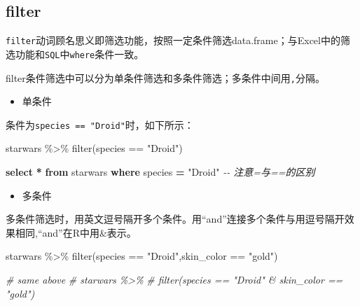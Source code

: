 \documentclass[
]{book}
\newenvironment{Shaded}{\begin{snugshade}}{\end{snugshade}}
\newcommand{\CommentTok}[1]{\textcolor[rgb]{0.56,0.35,0.01}{\textit{#1}}}
\newcommand{\FunctionTok}[1]{\textcolor[rgb]{0.00,0.00,0.00}{#1}}
\newcommand{\KeywordTok}[1]{\textcolor[rgb]{0.13,0.29,0.53}{\textbf{#1}}}
\newcommand{\NormalTok}[1]{#1}
\newcommand{\OperatorTok}[1]{\textcolor[rgb]{0.81,0.36,0.00}{\textbf{#1}}}
\newcommand{\OtherTok}[1]{\textcolor[rgb]{0.56,0.35,0.01}{#1}}
\newcommand{\SpecialCharTok}[1]{\textcolor[rgb]{0.00,0.00,0.00}{#1}}
\newcommand{\StringTok}[1]{\textcolor[rgb]{0.31,0.60,0.02}{#1}}
\providecommand{\tightlist}{%
  \setlength{\itemsep}{0pt}\setlength{\parskip}{0pt}}
\begin{document}
\hypertarget{dplyr-filter}{%
\subsection{filter}\label{dplyr-filter}}

\texttt{filter}动词顾名思义即筛选功能，按照一定条件筛选data.frame；与Excel中的筛选功能和\texttt{SQL}中\texttt{where}条件一致。

filter条件筛选中可以分为单条件筛选和多条件筛选；多条件中间用\texttt{,}分隔。

\begin{itemize}
\tightlist
\item
  单条件
\end{itemize}

条件为\texttt{species\ ==\ "Droid"}时，如下所示：

\begin{Shaded}
\begin{Highlighting}[]
\NormalTok{starwars }\SpecialCharTok{\%\textgreater{}\%} 
  \FunctionTok{filter}\NormalTok{(species }\SpecialCharTok{==} \StringTok{"Droid"}\NormalTok{)}
\end{Highlighting}
\end{Shaded}

\begin{Shaded}
\begin{Highlighting}[]
\KeywordTok{select} \OperatorTok{*} \KeywordTok{from}\NormalTok{ starwars }\KeywordTok{where}\NormalTok{ species }\OperatorTok{=} \OtherTok{"Droid"} \CommentTok{{-}{-} 注意=与==的区别}
\end{Highlighting}
\end{Shaded}

\begin{itemize}
\tightlist
\item
  多条件
\end{itemize}

多条件筛选时，用英文逗号隔开多个条件。用``and''连接多个条件与用逗号隔开效果相同,``and''在R中用\&表示。

\begin{Shaded}
\begin{Highlighting}[]
\NormalTok{starwars }\SpecialCharTok{\%\textgreater{}\%} 
  \FunctionTok{filter}\NormalTok{(species }\SpecialCharTok{==} \StringTok{"Droid"}\NormalTok{,skin\_color }\SpecialCharTok{==} \StringTok{"gold"}\NormalTok{)}

\CommentTok{\# same above}
\CommentTok{\# starwars \%\textgreater{}\% }
\CommentTok{\#   filter(species == "Droid" \& skin\_color == "gold")}
\end{Highlighting}
\end{Shaded}
\end{document}
